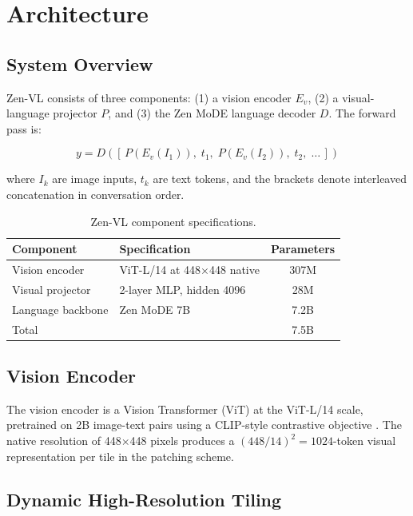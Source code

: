 \documentclass[11pt,a4paper]{article}
\begin{document}
\section{Architecture}

\subsection{System Overview}

Zen-VL consists of three components: (1) a vision encoder $E_v$, (2) a visual-language
projector $P$, and (3) the Zen MoDE language decoder $D$. The forward pass is:

\begin{equation}
  y = D\!\left([\, P(E_v(I_1)),\; t_1,\; P(E_v(I_2)),\; t_2,\; \ldots \,]\right)
\end{equation}

where $I_k$ are image inputs, $t_k$ are text tokens, and the brackets denote interleaved
concatenation in conversation order.

\begin{table}[H]
\centering
\caption{Zen-VL component specifications.}
\label{tab:arch}
\begin{tabular}{llc}
\toprule
\textbf{Component} & \textbf{Specification} & \textbf{Parameters} \\
\midrule
Vision encoder      & ViT-L/14 at 448$\times$448 native & 307M \\
Visual projector    & 2-layer MLP, hidden 4096 & 28M \\
Language backbone   & Zen MoDE 7B & 7.2B \\
\midrule
Total               & & 7.5B \\
\bottomrule
\end{tabular}
\end{table}

\subsection{Vision Encoder}

The vision encoder is a Vision Transformer (ViT) \cite{dosovitskiy2020vit} at the ViT-L/14
scale, pretrained on 2B image-text pairs using a CLIP-style contrastive objective
\cite{radford2021clip}. The native resolution of 448$\times$448 pixels produces a
$(448/14)^2 = 1024$-token visual representation per tile in the patching scheme.

\subsection{Dynamic High-Resolution Tiling}
\end{document}
